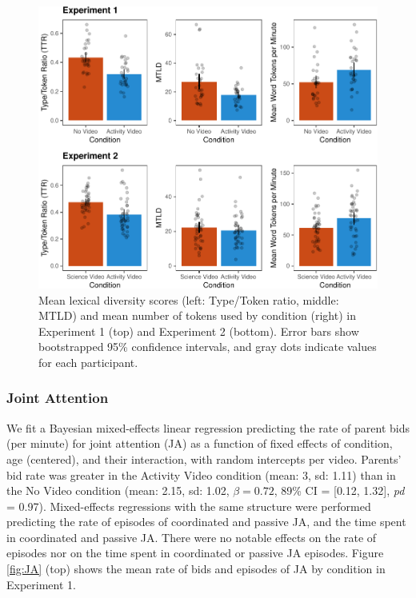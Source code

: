 \documentclass[man,floatsintext]{apa6}
\begin{document}
\begin{figure}[H]

{\centering \includegraphics{figs/fig-lexdiv-1} 

}

\caption{\label{fig:lexdiv} Mean lexical diversity scores (left: Type/Token ratio, middle: MTLD) and mean number of tokens used by condition (right) in Experiment 1 (top) and Experiment 2 (bottom). Error bars show bootstrapped 95\% confidence intervals, and gray dots indicate values for each participant.}\label{fig:fig-lexdiv}
\end{figure}

\hypertarget{joint-attention}{%
\subsubsection{Joint Attention}\label{joint-attention}}

We fit a Bayesian mixed-effects linear regression predicting the rate of parent bids (per minute) for joint attention (JA) as a function of fixed effects of condition, age (centered), and their interaction, with random intercepts per video.
Parents' bid rate was greater in the Activity Video condition (mean: 3, sd: 1.11) than in the No Video condition (mean: 2.15, sd: 1.02, \(\beta=0.72\), 89\% CI = {[}0.12, 1.32{]}, \emph{pd} = 0.97).
Mixed-effects regressions with the same structure were performed predicting the rate of episodes of coordinated and passive JA, and the time spent in coordinated and passive JA.
There were no notable effects on the rate of episodes nor on the time spent in coordinated or passive JA episodes.
Figure \ref{fig:JA} (top) shows the mean rate of bids and episodes of JA by condition in Experiment 1.
\end{document}
